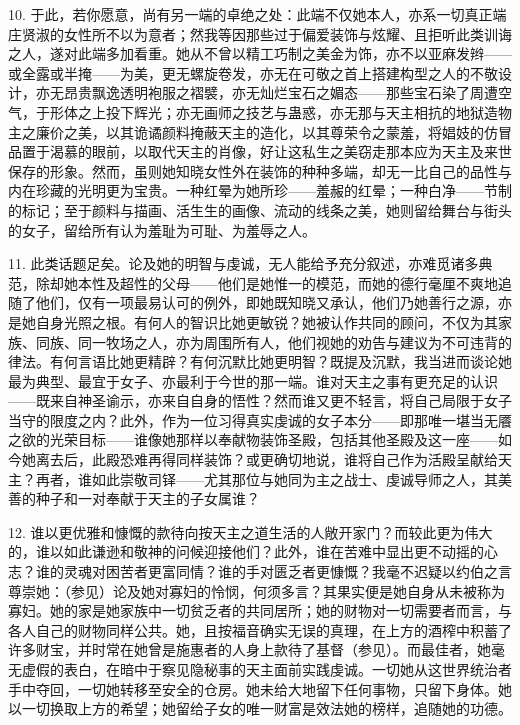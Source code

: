 10. 于此，若你愿意，尚有另一端的卓绝之处：此端不仅她本人，亦系一切真正端庄贤淑的女性所不以为意者；然我等因那些过于偏爱装饰与炫耀、且拒听此类训诲之人，遂对此端多加看重。她从不曾以精工巧制之美金为饰，亦不以亚麻发辫——或全露或半掩——为美，更无螺旋卷发，亦无在可敬之首上搭建构型之人的不敬设计，亦无昂贵飘逸透明袍服之褶襞，亦无灿烂宝石之媚态——那些宝石染了周遭空气，于形体之上投下辉光；亦无画师之技艺与蛊惑，亦无那与天主相抗的地狱造物主之廉价之美，以其诡谲颜料掩蔽天主的造化，以其尊荣令之蒙羞，将娼妓的仿冒品置于渴慕的眼前，以取代天主的肖像，好让这私生之美窃走那本应为天主及来世保存的形象。然而，虽则她知晓女性外在装饰的种种多端，却无一比自己的品性与内在珍藏的光明更为宝贵。一种红晕为她所珍——羞赧的红晕；一种白净——节制的标记；至于颜料与描画、活生生的画像、流动的线条之美，她则留给舞台与街头的女子，留给所有认为羞耻为可耻、为羞辱之人。\par

11. 此类话题足矣。论及她的明智与虔诚，无人能给予充分叙述，亦难觅诸多典范，除却她本性及超性的父母——他们是她惟一的模范，而她的德行毫厘不爽地追随了他们，仅有一项最易认可的例外，即她既知晓又承认，他们乃她善行之源，亦是她自身光照之根。有何人的智识比她更敏锐？她被认作共同的顾问，不仅为其家族、同族、同一牧场之人，亦为周围所有人，他们视她的劝告与建议为不可违背的律法。有何言语比她更精辟？有何沉默比她更明智？既提及沉默，我当进而谈论她最为典型、最宜于女子、亦最利于今世的那一端。谁对天主之事有更充足的认识——既来自神圣谕示，亦来自自身的悟性？然而谁又更不轻言，将自己局限于女子当守的限度之内？此外，作为一位习得真实虔诚的女子本分——即那唯一堪当无餍之欲的光荣目标——谁像她那样以奉献物装饰圣殿，包括其他圣殿及这一座——如今她离去后，此殿恐难再得同样装饰？或更确切地说，谁将自己作为活殿呈献给天主？再者，谁如此崇敬司铎——尤其那位与她同为主之战士、虔诚导师之人，其美善的种子和一对奉献于天主的子女属谁？\par

12. 谁以更优雅和慷慨的款待向按天主之道生活的人敞开家门？而较此更为伟大的，谁以如此谦逊和敬神的问候迎接他们？此外，谁在苦难中显出更不动摇的心志？谁的灵魂对困苦者更富同情？谁的手对匮乏者更慷慨？我毫不迟疑以约伯之言尊崇她：（参见）论及她对寡妇的怜悯，何须多言？其果实便是她自身从未被称为寡妇。她的家是她家族中一切贫乏者的共同居所；她的财物对一切需要者而言，与各人自己的财物同样公共。她，且按福音确实无误的真理，在上方的酒榨中积蓄了许多财宝，并时常在她曾是施惠者的人身上款待了基督（参见）。而最佳者，她毫无虚假的表白，在暗中于察见隐秘事的天主面前实践虔诚。一切她从这世界统治者手中夺回，一切她转移至安全的仓房。她未给大地留下任何事物，只留下身体。她以一切换取上方的希望；她留给子女的唯一财富是效法她的榜样，追随她的功德。\par

